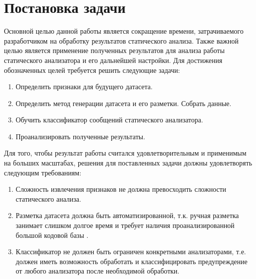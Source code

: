 \section{Постановка задачи}
\label{sec:Chapter1} 

Основной целью данной работы является сокращение времени, затрачиваемого разработчиком на обработку результатов статического анализа. Также важной целью является применение полученных результатов для анализа работы статического анализатора и его дальнейшей настройки. Для достижения обозначенных целей требуется решить следующие задачи:

\begin{enumerate}
    \item Определить признаки для будущего датасета.
    \item Определить метод генерации датасета и его разметки. Собрать данные.
    \item Обучить классификатор сообщений статического анализатора.
    \item Проанализировать полученные результаты.
\end{enumerate}

Для того, чтобы результат работы считался удовлетворительным и применимым на больших масштабах, решения для поставленных задачи должны удовлетворять следующим требованиям:

\begin{enumerate}
    \item Сложность извлечения признаков не должна превосходить сложности статического анализа.
    \item Разметка датасета должна быть автоматизированной, т.к. ручная разметка занимает слишком долгое время и требует наличия проанализированной большой кодовой базы \cite{Ayewah2010TheGF}.
    \item Классификатор не должен быть ограничен конкретными анализаторами, т.е. должен иметь возможность обработать и классифицировать предупреждение от любого анализатора после необходимой обработки.
\end{enumerate}

\newpage